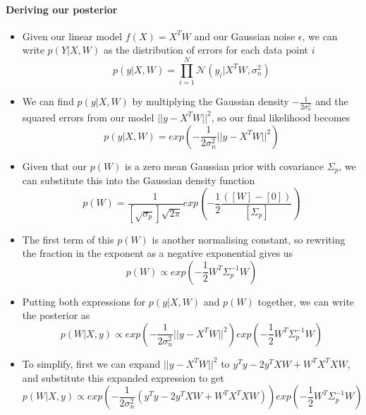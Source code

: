 \documentclass[12pt]{article}
\begin{document}
\paragraph{Deriving our posterior}
\begin{itemize}
     \item Given our linear model $f(X) = X^TW$ and our Gaussian noise $\epsilon$, we can write $p(Y|X,W)$ as the distribution of errors for each data point $i$
 \begin{equation}
     p(y|X,W) = \prod_{i=1}^N \mathcal{N}(y_i|X^TW, \sigma^2_n)
 \end{equation}
     \item We can find $p(y|X,W)$ by multiplying the Gaussian density $-\frac{1}{2\sigma^2_n}$ and the squared errors from our model $||y -X^TW||^2$, so our final likelihood becomes
 \begin{equation}
     p(y|X,W) = exp\left(-\frac{1}{2\sigma^2_n}||y -X^TW||^2\right)
 \end{equation}
     \item Given that our $p(W)$ is a zero mean Gaussian prior with covariance $\Sigma_p$, we can substitute this into the Gaussian density function
 \begin{equation}
     p(W) = \frac{1}{[\sqrt{\sigma_p}]\sqrt{2\pi}} exp\left(-\frac{1}{2}\frac{([W]-[0])}{[\Sigma_p]}\right)
 \end{equation}
     \item The first term of this $p(W)$ is another normalising constant, so rewriting the fraction in the exponent as a negative exponential gives us
 \begin{equation}
     p(W) \propto exp\left(-\frac{1}{2}W^T\Sigma_p^{-1}W\right)
 \end{equation}
     \item Putting both expressions for $p(y|X,W)$ and $p(W)$ together, we can write the posterior as
 \begin{equation}
     p(W|X,y) \propto exp\left(-\frac{1}{2\sigma^2_n}||y -X^TW||^2\right)exp\left(-\frac{1}{2}W^T\Sigma_p^{-1}W\right)
 \end{equation}
     \item To simplify, first we can expand $||y - X^TW||^2$ to $y^Ty - 2y^TXW + W^TX^TXW$, and substitute this expanded expression to get
 \begin{equation}
     p(W|X,y) \propto exp\left(-\frac{1}{2\sigma^2_n}(y^Ty - 2y^TXW + W^TX^TXW)\right)exp\left(-\frac{1}{2}W^T\Sigma_p^{-1}W\right)
 \end{equation}

\end{itemize}
\end{document}
